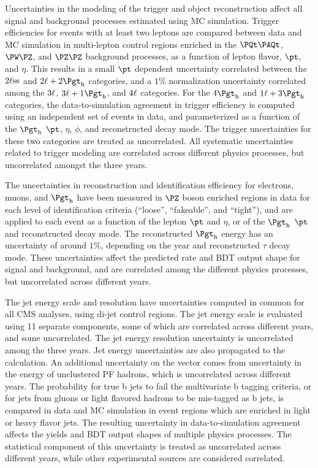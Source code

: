 Uncertainties in the modeling of the trigger and object reconstruction
affect all signal and background processes estimated using MC simulation.
Trigger efficiencies for events with at least two leptons are compared between
data and MC simulation in multi-lepton control regions enriched in the $\ttbar$,
$\PW\PZ$, and $\PZ\PZ$ background processes, as a function of lepton flavor,
$\pt$, and $\eta$.
This results in a small $\pt$ dependent uncertainty correlated between the
$2\ell\text{ss}$ and $\lltt$ categories, and a $1\%$ normalization uncertainty
correlated among the $3\ell$, $\lllt$, and $4\ell$ categories.
For the $\noltttt$ and $\lttt$ categories, the data-to-simulation agreement in
trigger efficiency is computed using an independent set of events in data,
and parameterized as a function of the $\tauh$ $\pt$, $\eta$, $\phi$, and
reconstructed decay mode. %
The trigger uncertainties for these two categories are treated as uncorrelated.
All systematic uncertainties related to trigger modeling are correlated
across different physics processes, but uncorrelated amongst the three years.

The uncertainties in reconstruction and identification efficiency for electrons,
muons, and $\tauh$ have been measured in $\PZ$ boson enriched regions in data
for each level of identification criteria (``loose'', ``fakeable'', and ``tight''),
and are applied to each event as a function of the lepton $\pt$ and $\eta$, or of
the $\tauh$ $\pt$ and reconstructed decay mode.
The reconstructed $\tauh$ energy has an uncertainty of around $1\%$, depending on
the year and reconstructed $\tau$ decay mode.
These uncertainties affect the predicted rate and BDT output shape for signal
and background, and are correlated among the different physics processes, but
uncorrelated across different years.

The jet energy scale and resolution have uncertainties computed in common for
all CMS analyses, using di-jet control regions. %
The jet energy scale is evaluated using 11 separate components, some of which
are correlated across different years, and some uncorrelated.
The jet energy resolution uncertainty is uncorrelated among the three years.
Jet energy uncertainties are also propagated to the \metET calculation.
An additional uncertainty on the \metET vector comes from uncertainty in
the energy of unclustered PF hadrons, which is uncorrelated across different years.
The probability for true b jets to fail the multivariate b tagging
criteria, or for jets from gluons or light flavored hadrons to be mis-tagged
as b jets, is compared in data and MC simulation in event regions which
are enriched in light or heavy flavor jets. %
The resulting uncertainty in data-to-simulation agreement affects the yields
and BDT output shapes of multiple physics processes.
The statistical component of this uncertainty is treated as uncorrelated across
different years, while other experimental sources are considered correlated.

